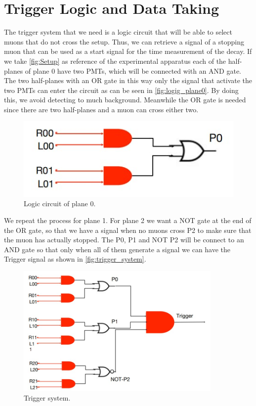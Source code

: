 \chapter{Trigger Logic and Data Taking}
\label{sec:trigger}
The trigger system that we need is a logic circuit that will be able to select muons
that do not cross the setup. Thus, we can retrieve a signal of a stopping muon 
that can be used as a start signal 
for the time measurement of the decay.
If we take \autoref{fig:Setup} as reference of the experimental apparatus 
each of the half-planes of plane 0 have two PMTs, which will be connected with an AND gate.
The two half-planes with an OR gate in this way only the signal
that activate the two PMTs can enter the circuit as can be seen in \autoref{fig:logig_plane0}.
By doing this, we avoid detecting to much background.
Meanwhile the OR gate is needed since there are two half-planes
and a muon can cross either two.\\
\begin{figure}[h]
\begin{center}
\includegraphics[width=80 mm,scale=0.5]{figures/Cattura2.png}
\end{center}
\caption{Logic circuit of plane 0.}
\label{fig:logig_plane0}
\end{figure}
We repeat the process for plane 1. For plane 2
we want a NOT gate at the end of the OR gate, so that we have a signal when no muons cross P2
to make sure that the muon has actually stopped. The P0, P1 and NOT P2 will be connect to an AND
gate so that only when all of them generate a signal we can have the Trigger signal as
shown in \autoref{fig:trigger_system}.

\begin{figure}[h]
\begin{center}
\includegraphics[width=100mm]{figures/Cattura3.png}
\end{center}
\caption{Trigger system.}
\label{fig:trigger_system}
\end{figure}

